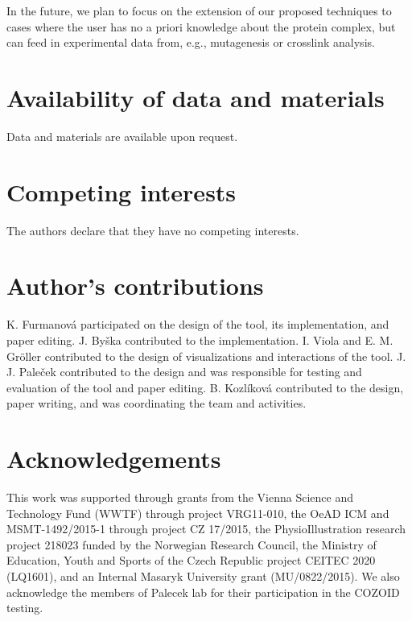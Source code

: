 \documentclass{bmcart}
\begin{document}
In the future, we plan to focus on the extension of our proposed techniques to cases where the user has no a priori knowledge about the protein complex, but can feed in experimental data from, e.g., mutagenesis or crosslink analysis.


\begin{backmatter}
\section*{Availability of data and materials}
Data and materials are available upon request.

\section*{Competing interests}
  The authors declare that they have no competing interests.

\section*{Author's contributions}
K. Furmanov\'{a} participated on the design of the tool, its implementation, and paper editing.  J. By\v{s}ka contributed to the implementation. I. Viola and E. M. Gr\"{o}ller contributed to the design of visualizations and interactions of the tool. J. J. Pale\v{c}ek contributed to the design and was responsible for testing and evaluation of the tool and paper editing. B. Kozl\'{i}kov\'{a} contributed to the design, paper writing, and was coordinating the team and activities.

\section*{Acknowledgements}
This work was supported through grants from the Vienna Science and Technology Fund (WWTF) through project VRG11-010, the OeAD ICM and MSMT-1492/2015-1 through project CZ 17/2015, the PhysioIllustration research project 218023 funded by the Norwegian Research Council, the Ministry of Education, Youth and Sports of the Czech Republic project CEITEC 2020 (LQ1601), and an Internal Masaryk University grant (MU/0822/2015). We also acknowledge the members of Palecek lab for their participation in the COZOID testing. 


\end{backmatter}
\end{document}
